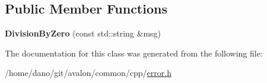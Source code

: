 \subsection*{Public Member Functions}
\begin{DoxyCompactItemize}
\item 
\mbox{\label{classtcf_1_1error_1_1DivisionByZero_ab50f6f039ecb86c873a0be45c5e8a625}} 
{\bfseries Division\+By\+Zero} (const std\+::string \&msg)
\end{DoxyCompactItemize}


The documentation for this class was generated from the following file\+:\begin{DoxyCompactItemize}
\item 
/home/dano/git/avalon/common/cpp/\hyperlink{error_8h}{error.\+h}\end{DoxyCompactItemize}
